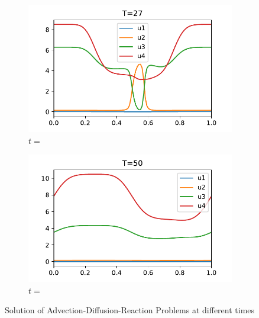 \documentclass[a4paper]{scrartcl}
\numberwithin{equation}{section}
\theoremstyle{plain}
\theoremstyle{definition}
\numberwithin{theorem}{section}
\newcommand{\1}{\mathbbm{1}}
\begin{document}
\begin{figure}
    \begin{subfigure}[b]{0.49\textwidth}
        \includegraphics[width=\textwidth]{plots/ADP_sol_27.pdf}
        \caption{$t=$}
        \label{fig:sol_ADP27}
    \end{subfigure}
	\begin{subfigure}[b]{0.49\textwidth}
        \includegraphics[width=\textwidth]{plots/ADP_sol_50.pdf}
        \caption{$t=$}
        \label{fig:sol_ADP50}
    \end{subfigure}

    \caption{Solution of Advection-Diffusion-Reaction Problems at different times}\label{fig:Sol_ADP}
\end{figure}
\end{document}
